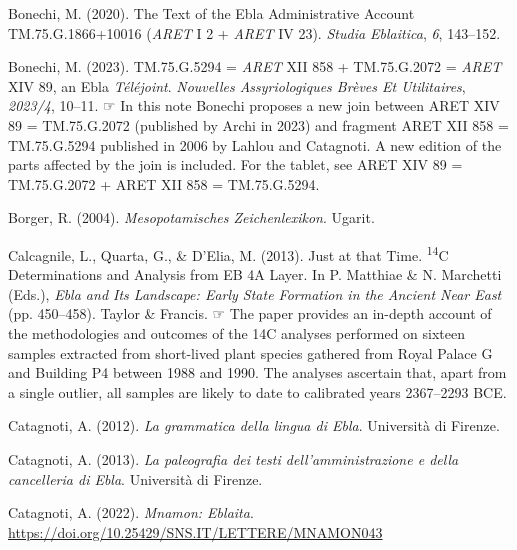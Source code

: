 \documentclass[
]{book}
\newlength{\cslhangindent}
\newlength{\cslentryspacingunit} %
\newenvironment{CSLReferences}[2] %
 {%
  \setlength{\parindent}{0pt}
  \ifodd #1
  \let\oldpar\par
  \def\par{\hangindent=\cslhangindent\oldpar}
  \fi
  \setlength{\parskip}{#2\cslentryspacingunit}
 }%
 {}
\newcommand{\CSLBlock}[1]{#1\hfill\break}
\begin{document}
\begin{CSLReferences}{1}{0}
\leavevmode{}%
Bonechi, M. (2020). The {Text} of the {Ebla Administrative Account TM}.75.{G}.1866+10016 ({\emph{ARET}} {I} 2 + {\emph{ARET}} {IV} 23). \emph{Studia Eblaitica}, \emph{6}, 143--152.

\leavevmode{}%
Bonechi, M. (2023). {TM}.75.{G}.5294 = {\emph{ARET}} {XII} 858 + {TM}.75.{G}.2072 = {\emph{ARET}} {XIV} 89, an {Ebla} {\emph{T{é}l{é}joint}}. \emph{Nouvelles Assyriologiques Br{è}ves Et Utilitaires}, \emph{2023/4}, 10--11.
\CSLBlock{\newline☞ In this note Bonechi proposes a new join between ARET XIV 89 = TM.75.G.2072 (published by Archi in 2023) and fragment ARET XII 858 = TM.75.G.5294 published in 2006 by Lahlou and Catagnoti. A new edition of the parts affected by the join is included. For the tablet, see ARET XIV 89 = TM.75.G.2072 + ARET XII 858 = TM.75.G.5294.}

\leavevmode{}%
Borger, R. (2004). \emph{{Mesopotamisches Zeichenlexikon}}. Ugarit.

\leavevmode{}%
Calcagnile, L., Quarta, G., \& D'Elia, M. (2013). Just at that {Time}. {\textsuperscript{14}}{C Determinations} and {Analysis} from {EB 4A Layer}. In P. Matthiae \& N. Marchetti (Eds.), \emph{Ebla and {Its Landscape}: {Early State Formation} in the {Ancient Near East}} (pp. 450--458). Taylor \& Francis.
\CSLBlock{\newline☞ The paper provides an in-depth account of the methodologies and outcomes of the 14C analyses performed on sixteen samples extracted from short-lived plant species gathered from Royal Palace G and Building P4 between 1988 and 1990. The analyses ascertain that, apart from a single outlier, all samples are likely to date to calibrated years 2367--2293 BCE.}

\leavevmode{}%
Catagnoti, A. (2012). \emph{{La grammatica della lingua di Ebla}}. Universit{à} di Firenze.

\leavevmode{}%
Catagnoti, A. (2013). \emph{{La paleografia dei testi dell'amministrazione e della cancelleria di Ebla}}. Universit{à} di Firenze.

\leavevmode{}%
Catagnoti, A. (2022). \emph{Mnamon: {Eblaita}}. \url{https://doi.org/10.25429/SNS.IT/LETTERE/MNAMON043}


\end{CSLReferences}
\end{document}
